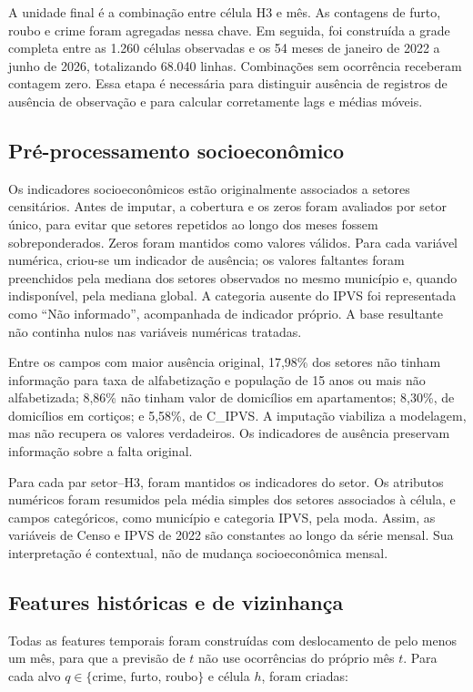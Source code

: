 \documentclass[12pt]{article}
\begin{document}
A unidade final é a combinação entre célula H3 e mês. As contagens de furto, roubo e crime foram agregadas nessa chave. Em seguida, foi construída a grade completa entre as 1.260 células observadas e os 54 meses de janeiro de 2022 a junho de 2026, totalizando 68.040 linhas. Combinações sem ocorrência receberam contagem zero. Essa etapa é necessária para distinguir ausência de registros de ausência de observação e para calcular corretamente lags e médias móveis.

\subsection{Pré-processamento socioeconômico}

Os indicadores socioeconômicos estão originalmente associados a setores censitários. Antes de imputar, a cobertura e os zeros foram avaliados por setor único, para evitar que setores repetidos ao longo dos meses fossem sobreponderados. Zeros foram mantidos como valores válidos. Para cada variável numérica, criou-se um indicador de ausência; os valores faltantes foram preenchidos pela mediana dos setores observados no mesmo município e, quando indisponível, pela mediana global. A categoria ausente do IPVS foi representada como ``Não informado'', acompanhada de indicador próprio. A base resultante não continha nulos nas variáveis numéricas tratadas.

Entre os campos com maior ausência original, 17,98\% dos setores não tinham informação para taxa de alfabetização e população de 15 anos ou mais não alfabetizada; 8,86\% não tinham valor de domicílios em apartamentos; 8,30\%, de domicílios em cortiços; e 5,58\%, de C\_IPVS. A imputação viabiliza a modelagem, mas não recupera os valores verdadeiros. Os indicadores de ausência preservam informação sobre a falta original.

Para cada par setor--H3, foram mantidos os indicadores do setor. Os atributos numéricos foram resumidos pela média simples dos setores associados à célula, e campos categóricos, como município e categoria IPVS, pela moda. Assim, as variáveis de Censo e IPVS de 2022 são constantes ao longo da série mensal. Sua interpretação é contextual, não de mudança socioeconômica mensal.

\subsection{Features históricas e de vizinhança}

Todas as features temporais foram construídas com deslocamento de pelo menos um mês, para que a previsão de $t$ não use ocorrências do próprio mês $t$. Para cada alvo $q\in\{\text{crime, furto, roubo}\}$ e célula $h$, foram criadas:
\end{document}
